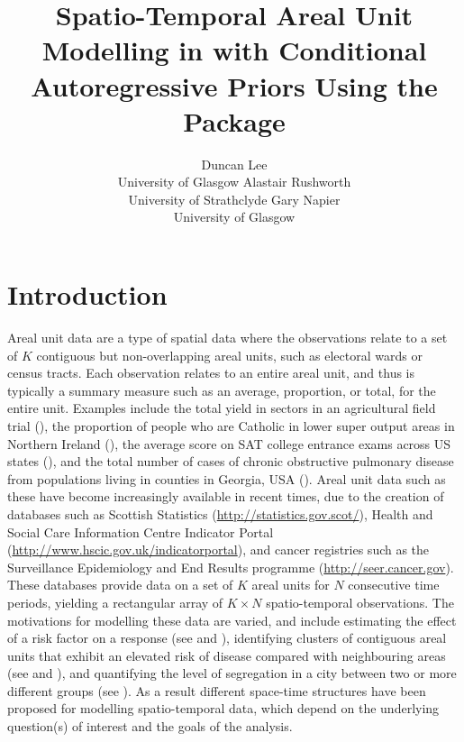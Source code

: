 \documentclass[article, nojss]{jss}
\author{Duncan Lee\\University of Glasgow \And Alastair Rushworth\\University of Strathclyde \And Gary Napier\\University of Glasgow}
\title{Spatio-Temporal Areal Unit Modelling in \pkg{R} with Conditional Autoregressive Priors Using the \pkg{CARBayesST} Package}
\begin{document}





\section{Introduction}
Areal unit data are a type of spatial data where the observations relate to a set of $K$ contiguous but non-overlapping areal units, such as electoral wards or census tracts. Each observation relates to an entire areal unit, and thus is typically a summary measure such as an average, proportion, or total, for the entire unit. Examples include the total yield in sectors in an agricultural field trial (\citealp{besag1999}), the proportion of people who are Catholic in lower super output areas in Northern Ireland (\citealp{lee2015}), the average score on SAT college entrance exams across US states (\citealp{wall2004}), and the total number of cases of chronic obstructive pulmonary disease from populations living in counties in Georgia, USA (\citealp{choiENV11}). Areal unit data such as these have become increasingly available in recent times, due to the creation of databases such as Scottish Statistics (\url{http://statistics.gov.scot/}), Health and Social Care Information Centre Indicator Portal (\url{http://www.hscic.gov.uk/indicatorportal}), and cancer registries such as the Surveillance Epidemiology and End Results programme (\url{http://seer.cancer.gov}).\\

 These databases provide data on a set of $K$ areal units for $N$ consecutive time periods, yielding a rectangular array of $K\times N$ spatio-temporal observations. The motivations for modelling these data are varied, and include estimating the effect of a risk factor on a response (see \citealp{wakefield2007} and \citealp{lee2009}), identifying clusters of contiguous areal units that exhibit an elevated risk of disease compared with neighbouring areas (see \citealp{charras2012} and \citealp{anderson2014}), and quantifying the level of segregation in a city between two or more different groups (see \citealp{lee2015}). As a result different space-time structures have been proposed for modelling spatio-temporal data, which depend on the underlying question(s) of interest and the goals of the analysis.\\
 
\end{document}
